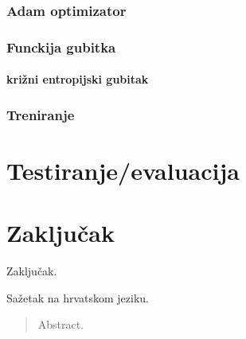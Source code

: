 \documentclass[times, utf8, zavrsni,numeric,pstricks]{fer}
\begin{document}
\subsection{Adam optimizator}
\subsection{Funckija gubitka}
\subsubsection{križni entropijski gubitak}
\subsection{Treniranje}

\chapter{Testiranje/evaluacija}

\chapter{Zaključak}
Zaključak.




\begin{sazetak}
Sažetak na hrvatskom jeziku.

\end{sazetak}



\begin{abstract}
Abstract.

\end{abstract}
\end{document}
